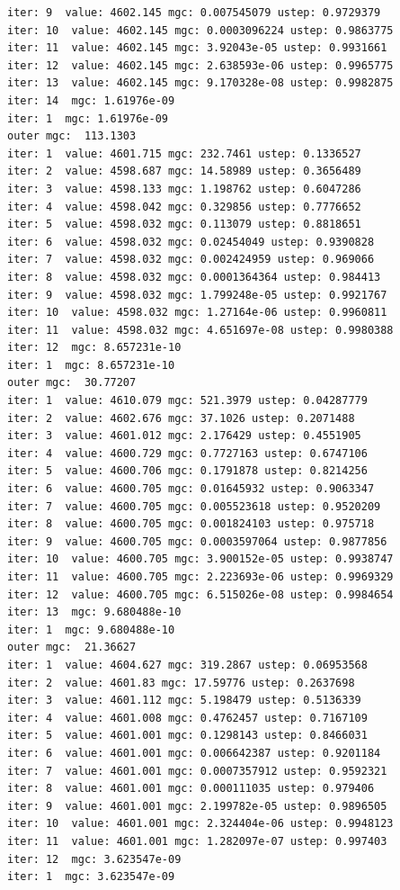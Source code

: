 \documentclass[
  letterpaper,
  DIV=11,
  numbers=noendperiod]{scrartcl}
\begin{document}
\begin{verbatim}
iter: 9  value: 4602.145 mgc: 0.007545079 ustep: 0.9729379 
iter: 10  value: 4602.145 mgc: 0.0003096224 ustep: 0.9863775 
iter: 11  value: 4602.145 mgc: 3.92043e-05 ustep: 0.9931661 
iter: 12  value: 4602.145 mgc: 2.638593e-06 ustep: 0.9965775 
iter: 13  value: 4602.145 mgc: 9.170328e-08 ustep: 0.9982875 
iter: 14  mgc: 1.61976e-09 
iter: 1  mgc: 1.61976e-09 
outer mgc:  113.1303 
iter: 1  value: 4601.715 mgc: 232.7461 ustep: 0.1336527 
iter: 2  value: 4598.687 mgc: 14.58989 ustep: 0.3656489 
iter: 3  value: 4598.133 mgc: 1.198762 ustep: 0.6047286 
iter: 4  value: 4598.042 mgc: 0.329856 ustep: 0.7776652 
iter: 5  value: 4598.032 mgc: 0.113079 ustep: 0.8818651 
iter: 6  value: 4598.032 mgc: 0.02454049 ustep: 0.9390828 
iter: 7  value: 4598.032 mgc: 0.002424959 ustep: 0.969066 
iter: 8  value: 4598.032 mgc: 0.0001364364 ustep: 0.984413 
iter: 9  value: 4598.032 mgc: 1.799248e-05 ustep: 0.9921767 
iter: 10  value: 4598.032 mgc: 1.27164e-06 ustep: 0.9960811 
iter: 11  value: 4598.032 mgc: 4.651697e-08 ustep: 0.9980388 
iter: 12  mgc: 8.657231e-10 
iter: 1  mgc: 8.657231e-10 
outer mgc:  30.77207 
iter: 1  value: 4610.079 mgc: 521.3979 ustep: 0.04287779 
iter: 2  value: 4602.676 mgc: 37.1026 ustep: 0.2071488 
iter: 3  value: 4601.012 mgc: 2.176429 ustep: 0.4551905 
iter: 4  value: 4600.729 mgc: 0.7727163 ustep: 0.6747106 
iter: 5  value: 4600.706 mgc: 0.1791878 ustep: 0.8214256 
iter: 6  value: 4600.705 mgc: 0.01645932 ustep: 0.9063347 
iter: 7  value: 4600.705 mgc: 0.005523618 ustep: 0.9520209 
iter: 8  value: 4600.705 mgc: 0.001824103 ustep: 0.975718 
iter: 9  value: 4600.705 mgc: 0.0003597064 ustep: 0.9877856 
iter: 10  value: 4600.705 mgc: 3.900152e-05 ustep: 0.9938747 
iter: 11  value: 4600.705 mgc: 2.223693e-06 ustep: 0.9969329 
iter: 12  value: 4600.705 mgc: 6.515026e-08 ustep: 0.9984654 
iter: 13  mgc: 9.680488e-10 
iter: 1  mgc: 9.680488e-10 
outer mgc:  21.36627 
iter: 1  value: 4604.627 mgc: 319.2867 ustep: 0.06953568 
iter: 2  value: 4601.83 mgc: 17.59776 ustep: 0.2637698 
iter: 3  value: 4601.112 mgc: 5.198479 ustep: 0.5136339 
iter: 4  value: 4601.008 mgc: 0.4762457 ustep: 0.7167109 
iter: 5  value: 4601.001 mgc: 0.1298143 ustep: 0.8466031 
iter: 6  value: 4601.001 mgc: 0.006642387 ustep: 0.9201184 
iter: 7  value: 4601.001 mgc: 0.0007357912 ustep: 0.9592321 
iter: 8  value: 4601.001 mgc: 0.000111035 ustep: 0.979406 
iter: 9  value: 4601.001 mgc: 2.199782e-05 ustep: 0.9896505 
iter: 10  value: 4601.001 mgc: 2.324404e-06 ustep: 0.9948123 
iter: 11  value: 4601.001 mgc: 1.282097e-07 ustep: 0.997403 
iter: 12  mgc: 3.623547e-09 
iter: 1  mgc: 3.623547e-09 

\end{verbatim}
\end{document}
